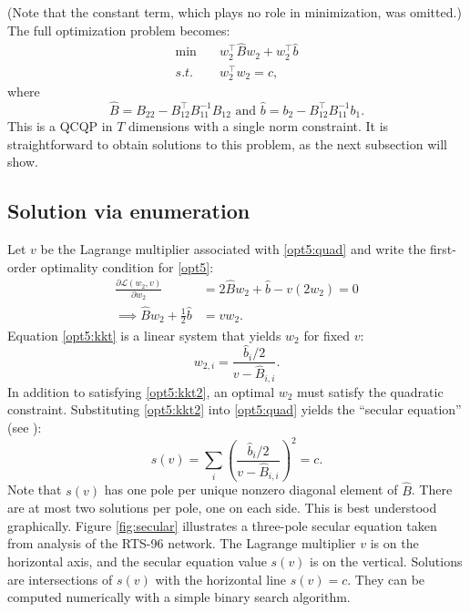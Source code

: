 \documentclass[conference]{IEEEtran}
\begin{document}
(Note that the constant term, which plays no role in minimization, was
omitted.) The full optimization problem becomes:
\begin{subequations}\label{opt5}
\begin{align}
\min\quad & w_2^\top \hat{B}w_2 + w_2^\top \hat{b} \\
\label{opt5:quad} s.t.\quad & w_2^\top w_2 = c,
\end{align}
\end{subequations}
where
\[
\hat{B} = B_{22} - B_{12}^\top B_{11}^{-1}B_{12} \text{ and }\hat{b} = b_2 - B_{12}^\top B_{11}^{-1}b_1.
\]
This is a QCQP in $T$ dimensions with a single norm constraint. It is
straightforward to obtain solutions to this problem, as the next
subsection will show.

\subsection{Solution via enumeration}

Let $v$ be the Lagrange multiplier associated with \eqref{opt5:quad}
and write the first-order optimality condition for \eqref{opt5}:
\begin{align}
\nonumber \frac{\partial \mathcal{L}(w_2,v)}{\partial w_2} &= 2\hat{B}w_2 + \hat{b} - v(2w_2) = 0 \\
\label{opt5:kkt} \implies \hat{B}w_2 + \frac{1}{2}\hat{b} &= vw_2.
\end{align}
Equation \eqref{opt5:kkt} is a linear system that yields $w_2$ for fixed $v$:
\begin{equation}
\label{opt5:kkt2}w_{2,i} = \frac{\hat{b}_i/2}{v - \hat{B}_{i,i}}.
\end{equation}
In addition to satisfying \eqref{opt5:kkt2}, an optimal $w_2$ must
satisfy the quadratic constraint. Substituting \eqref{opt5:kkt2} into
\eqref{opt5:quad} yields the ``secular equation'' (see
\cite{bienstock2014}):
\begin{equation}
s(v) = \sum_{i}\left( \frac{\hat{b}_i /2}{v - \hat{B}_{i,i}}\right)^2 = c.
\end{equation}
Note that $s(v)$ has one pole per unique nonzero diagonal element of
$\hat{B}$. There are at most two solutions per pole, one on each
side. This is best understood graphically. Figure \ref{fig:secular}
illustrates a three-pole secular equation taken from analysis of the
RTS-96 network. The Lagrange multiplier $v$ is on the horizontal axis,
and the secular equation value $s(v)$ is on the vertical. Solutions
are intersections of $s(v)$ with the horizontal line $s(v)=c$. They
can be computed numerically with a simple binary search algorithm.
\end{document}
